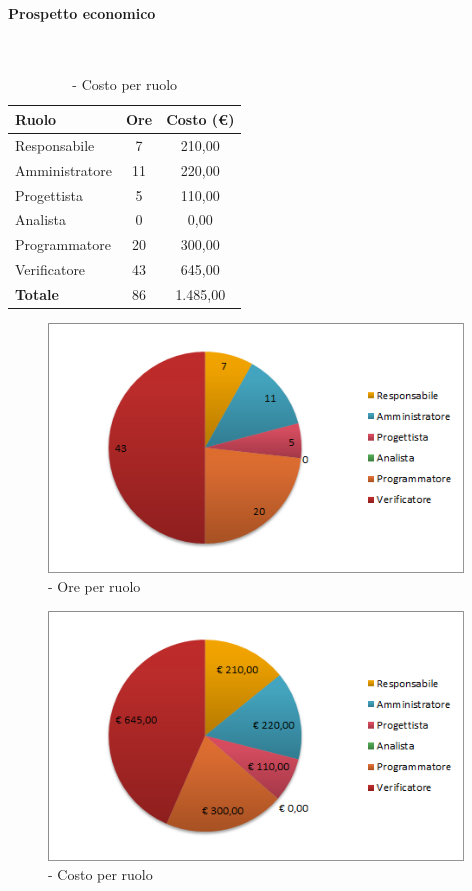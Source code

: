 \documentclass[./PianoDiProgetto.tex]{subfiles}
\begin{document}
\vspace{35 mm}	
	\paragraph{Prospetto economico}\
					
	\begin{table}[H]
		\centering
	
		\begin{tabular}{l * {2}{c}}
			\toprule
			\textbf{Ruolo} & \textbf{Ore} & \textbf{Costo (\euro{})} \\
			\midrule
			Responsabile & 7 & 210,00 \\
			Amministratore  & 11 & 220,00 \\
			Progettista  & 5 & 110,00 \\
			Analista & 0 & 0,00 \\
			Programmatore  & 20 &  300,00 \\
			Verificatore  & 43 &  645,00 \\
			\midrule
			\textbf{Totale}  & 86   &  1.485,00 \\
			\bottomrule	
		\end{tabular}
		\caption{\PerV{} - Costo per ruolo}
	\end{table}
\vfill	
	
	\begin{figure}[H]
		\centering
		\includegraphics[width=11cm, trim=1cm 0cm 1cm 0cm]{grafici/V-ruolo}
			\caption{\PerV{} - Ore per ruolo}
	\end{figure}
\vfill	

	\begin{figure}[H]
		\centering
		\includegraphics[width=11cm, trim=1cm 0cm 1cm 0cm]{grafici/V-costo}
			\caption{\PerV{} - Costo per ruolo}
	\end{figure}	
	
\end{document}
